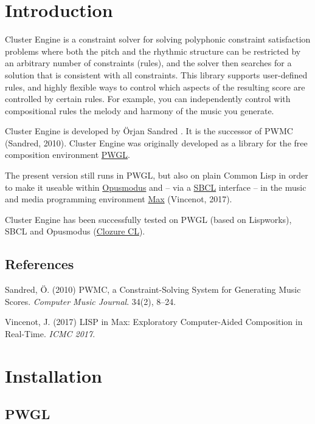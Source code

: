 

\section*{Introduction}
\label{sec:org54f84e6}

Cluster Engine is a constraint solver for solving polyphonic constraint satisfaction problems where both the pitch and the rhythmic structure can be restricted by an arbitrary number of constraints (rules), and the solver then searches for a solution that is consistent with all constraints. This library supports user-defined rules, and highly flexible ways to control which aspects of the resulting score are controlled by certain rules. For example, you can independently control with compositional rules the melody and harmony of the music you generate. 

Cluster Engine is developed by Örjan Sandred . It is the successor of PWMC (Sandred, 2010). Cluster Engine was originally developed as a library for the free composition environment \href{http://www2.siba.fi/pwgl}{PWGL}. 

The present version still runs in PWGL, but also on plain Common Lisp in order to make it useable within \href{http://opusmodus.com}{Opusmodus} and -- via a \href{http://www.sbcl.org}{SBCL} interface -- in the music and media programming environment \href{https://cycling74.com/products/max}{Max} (Vincenot, 2017).

Cluster Engine has been successfully tested on PWGL (based on Lispworks), SBCL and Opusmodus (\href{http://ccl.clozure.com}{Clozure CL}).


\subsection*{References}
\label{sec:org7915ec7}

Sandred, Ö. (2010) PWMC, a Constraint-Solving System for Generating Music Scores. \emph{Computer Music Journal}. 34(2), 8–24.

Vincenot, J. (2017) LISP in Max: Exploratory Computer-Aided Composition in Real-Time. \emph{ICMC 2017}.


\section*{Installation}
\label{sec:orgbf62365}

\subsection*{PWGL}
\label{sec:org4415d04}

